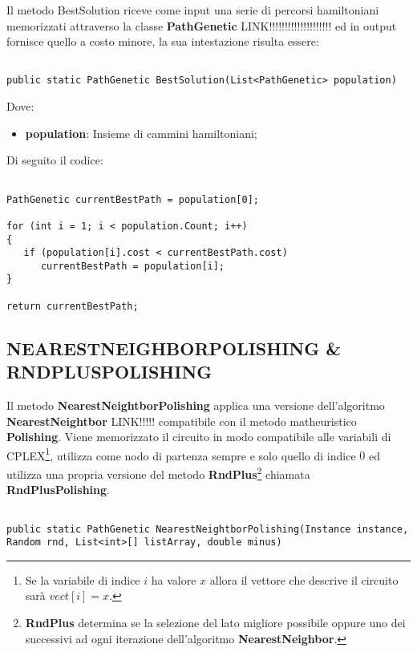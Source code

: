 \documentclass[11pt]{article}
\begin{document}
Il metodo BestSolution riceve come input una serie di percorsi hamiltoniani memorizzati attraverso la classe \textbf{PathGenetic} LINK!!!!!!!!!!!!!!!!!!!! ed in output fornisce quello a costo minore, la sua intestazione risulta essere:

\begin{lstlisting}

public static PathGenetic BestSolution(List<PathGenetic> population)

\end{lstlisting}

Dove:

\begin{itemize}
    \item \textbf{population}: Insieme di cammini hamiltoniani;
\end{itemize}

Di seguito il codice:

\begin{lstlisting}

PathGenetic currentBestPath = population[0];

for (int i = 1; i < population.Count; i++)
{
   if (population[i].cost < currentBestPath.cost)
      currentBestPath = population[i];
}

return currentBestPath;

\end{lstlisting}

\subsection*{NEARESTNEIGHBORPOLISHING \& RNDPLUSPOLISHING}
\label{sec:NNPRNDPS}

Il metodo \textbf{NearestNeightborPolishing} applica una versione dell'algoritmo \textbf{NearestNeightbor} LINK!!!!! compatibile con il metodo matheuristico \textbf{Polishing}.
Viene memorizzato il circuito in modo compatibile alle variabili di CPLEX\footnote{Se la variabile di indice $i$ ha valore $x$ allora il vettore che descrive il circuito sarà $vect[i] = x$.}, utilizza come nodo di partenza sempre e solo quello di indice $0$ ed utilizza una propria versione del metodo \textbf{RndPlus}\footnote{\textbf{RndPlus} determina se la selezione del lato migliore possibile oppure uno dei successivi ad ogni iterazione dell'algoritmo \textbf{NearestNeighbor}.} chiamata \textbf{RndPlusPolishing}.

\begin{lstlisting}

public static PathGenetic NearestNeightborPolishing(Instance instance, Random rnd, List<int>[] listArray, double minus)

\end{lstlisting}
\end{document}
